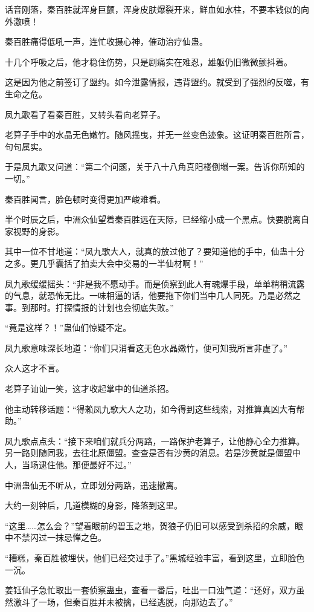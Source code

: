 \begin{this_body}
话音刚落，秦百胜就浑身巨颤，浑身皮肤爆裂开来，鲜血如水柱，不要本钱似的向外激喷！

秦百胜痛得低吼一声，连忙收摄心神，催动治疗仙蛊。

十几个呼吸之后，他才稳住伤势，只是剧痛实在难忍，雄躯仍旧微微颤抖着。

这是因为他之前签订了盟约。如今泄露情报，违背盟约。就受到了强烈的反噬，有生命之危。

凤九歌看了看秦百胜，又转头看向老算子。

老算子手中的水晶无色嫩竹。随风摇曳，并无一丝变色迹象。这证明秦百胜所言，句句属实。

于是凤九歌又问道：“第二个问题，关于八十八角真阳楼倒塌一案。告诉你所知的一切。”

秦百胜闻言，脸色顿时变得更加严峻难看。

半个时辰之后，中洲众仙望着秦百胜远在天际，已经缩小成一个黑点。快要脱离自家视野的身影。

其中一位不甘地道：“凤九歌大人，就真的放过他了？要知道他的手中，仙蛊十分之多。更几乎囊括了拍卖大会中交易的一半仙材啊！”

凤九歌缓缓摇头：“非是我不愿动手。而是侦察到此人有魂爆手段，单单稍稍流露的气息，就恐怖无比。一味相逼的话，他要拖下你们当中几人同死。乃是必然之事。到那时。打探情报的计划也会彻底失败。”

“竟是这样？！”蛊仙们惊疑不定。

凤九歌意味深长地道：“你们只消看这无色水晶嫩竹，便可知我所言非虚了。”

众人这才不言。

老算子讪讪一笑，这才收起掌中的仙道杀招。

他主动转移话题：“得赖凤九歌大人之功，如今得到这些线索，对推算真凶大有帮助。”

凤九歌点点头：“接下来咱们就兵分两路，一路保护老算子，让他静心全力推算。另一路则随同我，去往北原僵盟。查查是否有沙黄的消息。若是沙黄就是僵盟中人，当场逮住他。那便最好不过。”

中洲蛊仙无不听从，立即划分两路，迅速撤离。

大约一刻钟后，几道模糊的身影，降落到这里。

“这里……怎么会？”望着眼前的碧玉之地，贺狼子仍旧可以感受到杀招的余威，眼中不禁闪过一抹忌惮之色。

“糟糕，秦百胜被埋伏，他们已经交过手了。”黑城经验丰富，看到这里，立即脸色一沉。

姜钰仙子急忙取出一套侦察蛊虫，查看一番后，吐出一口浊气道：“还好，双方虽然激斗了一场，但秦百胜并未被擒，已经逃脱，向那边去了。”


\end{this_body}
